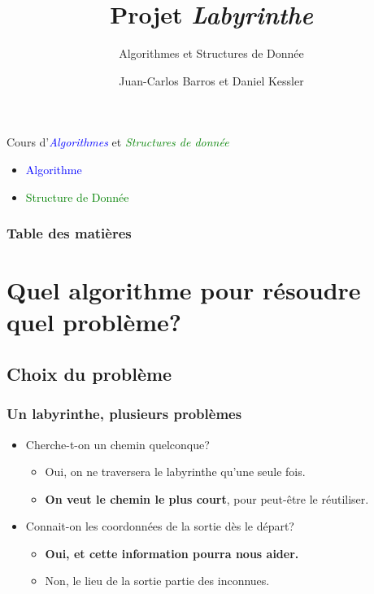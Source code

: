\documentclass{beamer}
\title{Projet \textit{Labyrinthe}}
\subtitle{Algorithmes et Structures de Donnée}
\author{Juan-Carlos Barros et Daniel Kessler}
\begin{document}
\begin{frame}
  \titlepage
\end{frame}

\begin{frame}
  Cours d'\textit{\textcolor<1>{blue}{Algorithmes}}
  et \textit{\textcolor<1>{green}{Structures de donnée}}
  \par\bigskip
  \par
  \begin{minipage}{.5\linewidth}
  \begin{itemize}
  \item<2->\textcolor{blue}{Algorithme}\par{}
  \item<2->\textcolor{green}{Structure de Donnée}\par{}
  \end{itemize}
  \end{minipage}
  \begin{minipage}{.3\linewidth}
  \end{minipage}
\end{frame} %

\begin{frame}
  \frametitle{Table des matières}
  \tableofcontents
\end{frame} %

\section{Quel algorithme pour résoudre quel problème?}
\subsection{Choix du problème}
\begin{frame} 
  \frametitle{Un labyrinthe, plusieurs problèmes}
  \begin{itemize}
  \item<1-> Cherche-t-on un chemin quelconque?
    \begin{itemize}
    \item<2-> Oui, on ne traversera le labyrinthe qu'une seule fois.
    \item<2-> \textbf<3->{On veut le chemin le plus court}, pour peut-être le réutiliser.
    \end{itemize}
  \item<4-> Connait-on les coordonnées de la sortie dès le départ?
    \begin{itemize}
    \item<5-> \textbf<6->{Oui, et cette information pourra nous aider.}
    \item<5-> Non, le lieu de la sortie partie des inconnues.
    \end{itemize}
  \end{itemize}
\end{frame} %
\end{document}
